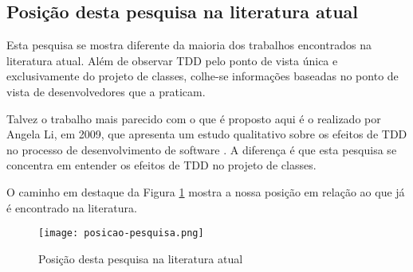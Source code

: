 \subsection{Posição desta pesquisa na literatura atual}

Esta pesquisa se mostra diferente da maioria dos trabalhos encontrados na
literatura atual. Além de observar TDD pelo ponto de vista única e
exclusivamente do projeto de classes, colhe-se informações baseadas no ponto de
vista de desenvolvedores que a praticam.

Talvez o trabalho mais parecido com o que é proposto aqui é o
realizado por Angela Li, em 2009, que apresenta um estudo qualitativo sobre os
efeitos de TDD no processo de desenvolvimento de software \cite{angela-li}. 
A diferença é que esta pesquisa se concentra em entender os
efeitos de TDD no projeto de classes.

O caminho em destaque da Figura \ref{fig:posicao-pesquisa} mostra a nossa posição
em relação ao que já é encontrado na literatura.

\begin{figure}[h!]
  \centering
  \texttt{[image: posicao-pesquisa.png]}
  \caption{Posição desta pesquisa na literatura atual}
  \label{fig:posicao-pesquisa}
\end{figure}


